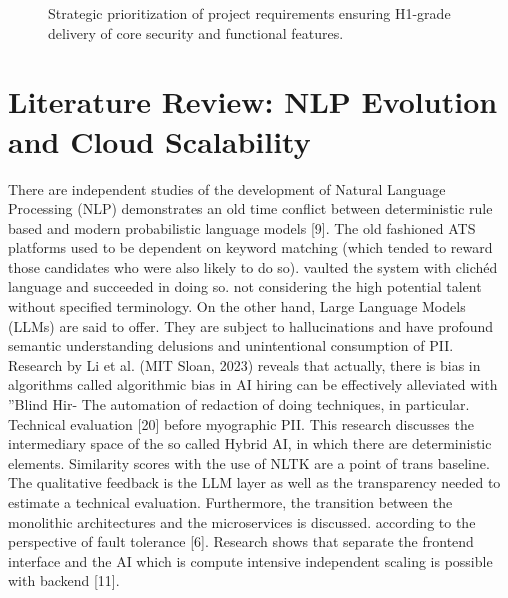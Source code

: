 \documentclass[conference]{IEEEtran}
\begin{document}
\begin{figure}[htbp]
\centering
{}
\caption{Strategic prioritization of project requirements ensuring H1-grade delivery of core security and functional features.}
\label{fig:moscow}
\end{figure}

\section{Literature Review: NLP Evolution and Cloud Scalability}
There are independent studies of the development of Natural Language Processing (NLP) demonstrates an old time conflict between deterministic rule based and modern probabilistic language models [9]. The old fashioned ATS platforms used to be dependent on keyword matching (which tended to reward those candidates who were also likely to do so). vaulted the system with clichéd language and succeeded in doing so. not considering the high potential talent without specified terminology. On the other hand, Large Language Models (LLMs) are said to offer. They are subject to hallucinations and have profound semantic understanding delusions and unintentional consumption of PII. Research by Li et al. (MIT Sloan, 2023) reveals that actually, there is bias in algorithms called algorithmic bias in AI hiring can be effectively alleviated with ”Blind Hir- The automation of redaction of doing techniques, in particular. Technical evaluation [20] before myographic PII. This research discusses the intermediary space of the so called Hybrid AI, in which there are deterministic elements. Similarity scores with the use of NLTK are a point of trans baseline. The qualitative feedback is the LLM layer as well as the transparency needed to estimate a technical evaluation. Furthermore, the transition between the monolithic architectures and the microservices is discussed. according to the perspective of fault tolerance [6]. Research shows that separate the frontend interface and the AI which is compute intensive independent scaling is possible with backend [11].
\end{document}
